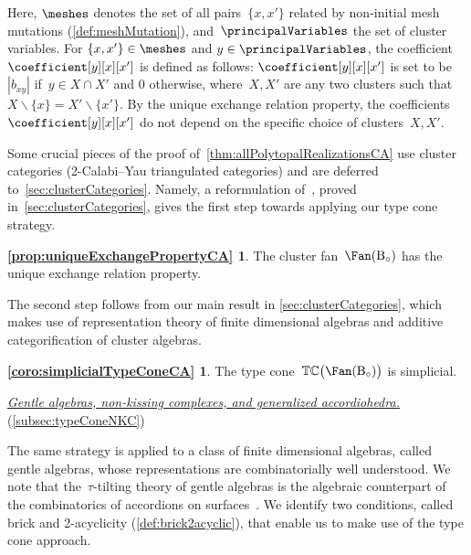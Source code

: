 \documentclass{amsart}
\theoremstyle{definition}
\newcommand{\ssm}{\smallsetminus} %
\newcommand{\para}[1]{\medskip\noindent\uline{\textit{#1.}}} %
\newcommand{\typeCone}{\mathbb{TC}} %
\newcommand{\B}{\mathrm{B}} %
\begin{document}
Here, $\meshes$ denotes the set of all pairs~$\{x,x'\}$ related by non-initial mesh mutations (\cref{def:meshMutation}), and~$\principalVariables$ the set of cluster variables.
For $\{x,x'\} \in \meshes$ and $y \in \principalVariables$, the coefficient $\coefficient[y][x][x']$ is defined as follows: $\coefficient[y][x][x']$ is set to be~$|b_{xy}|$ if~$y\in X\cap X'$ and $0$ otherwise, where~$X,X'$ are any two clusters such that~$X \ssm \{x\} = X' \ssm \{x'\}$. By the unique exchange relation property, the coefficients~$\coefficient[y][x][x']$ do not depend on the specific choice of clusters~$X,X'$.

\medskip

Some crucial pieces of the proof of~\cref{thm:allPolytopalRealizationsCA} use cluster categories (2-Calabi--Yau triangulated categories) and are deferred to~\cref{sec:clusterCategories}. Namely, a reformulation of~\cite[Thm.~7.5]{BuanMarshReinekeReitenTodorov}, proved in~\cref{sec:clusterCategories}, gives the first step towards applying our type cone strategy.

\newtheorem*{prop:uniqueExchangePropertyCA}{\cref{prop:uniqueExchangePropertyCA}}
\begin{prop:uniqueExchangePropertyCA}
The cluster fan~$\Fan(\B_\circ)$ has the unique exchange relation property.
\end{prop:uniqueExchangePropertyCA}

The second step follows from our main result in \cref{sec:clusterCategories}, which makes use of representation theory of finite dimensional algebras and additive categorification of cluster algebras.

\newtheorem*{coro:simplicialTypeConeCA}{\cref{coro:simplicialTypeConeCA}}
\begin{coro:simplicialTypeConeCA}
The type cone~$\typeCone \big( \Fan(\B_\circ) \big)$ is simplicial.
\end{coro:simplicialTypeConeCA}

\para{Gentle algebras, non-kissing complexes, and generalized accordiohedra}
(\cref{subsec:typeConeNKC})

\noindent
The same strategy is applied to a class of finite dimensional algebras, called gentle algebras, whose representations are combinatorially well understood.
We note that the~$\tau$-tilting theory of gentle algebras is the algebraic counterpart of the combinatorics of accordions on surfaces~\cite{PaluPilaudPlamondon-nonkissing,BrustleDouvilleMousavandThomasYildirim,PaluPilaudPlamondon-surfaces}.
We identify two conditions, called brick and 2-acyclicity (\cref{def:brick2acyclic}), that enable us to make use of the type cone approach.
\end{document}
